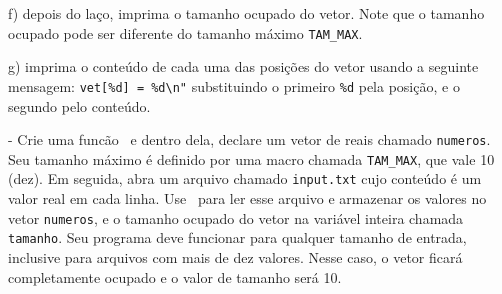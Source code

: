 f) depois do laço, imprima o tamanho ocupado do vetor. Note que o tamanho ocupado pode ser diferente do tamanho máximo \verb|TAM_MAX|.

g) imprima o conteúdo de cada uma das posições do vetor usando a seguinte mensagem: \verb|vet[%d] = %d\n"| substituindo o primeiro \verb|%d| pela posição, e o segundo pelo conteúdo.

\NEWLINE
\quest - Crie uma funcão \MAIN\ e dentro dela, declare um vetor de reais chamado {\tt numeros}. Seu tamanho máximo é definido por uma macro chamada \verb|TAM_MAX|, que vale 10 (dez). Em seguida, abra um arquivo chamado {\tt input.txt} cujo conteúdo é um valor real em cada linha. Use \FSCANF\ para ler esse arquivo e armazenar os valores no vetor {\tt numeros}, e o tamanho ocupado do vetor na variável inteira chamada {\tt tamanho}. Seu programa deve funcionar para qualquer tamanho de entrada, inclusive para arquivos com mais de dez valores. Nesse caso, o vetor ficará completamente ocupado e o valor de tamanho será 10.


